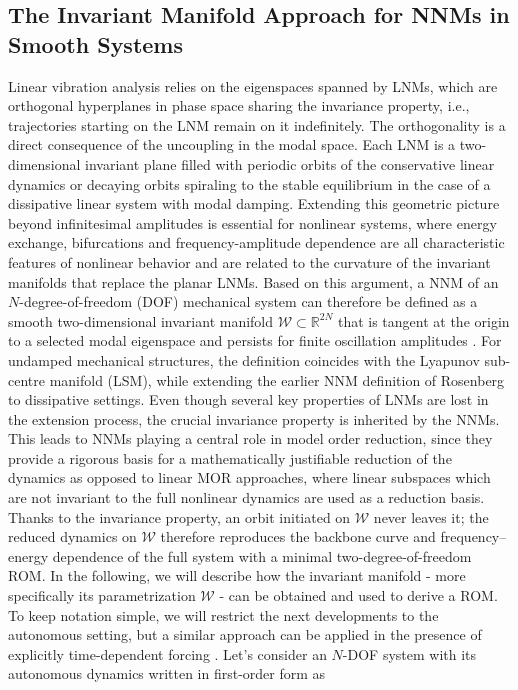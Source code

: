 \documentclass[a4paper,9pt,parskip=half,english]{article}
\theoremstyle{plain}
\theoremstyle{definition}
\newcommand{\mR}{\mathbb{R}}
\begin{document}
\subsection{The Invariant Manifold Approach for NNMs in Smooth Systems}\label{Subsection_invManifApproach}
Linear vibration analysis relies on the eigenspaces spanned by LNMs, which are orthogonal hyperplanes in phase space sharing the invariance property, i.e., trajectories starting on the LNM remain on it indefinitely. The orthogonality is a direct consequence of the uncoupling in the modal space. Each LNM is a two-dimensional invariant plane filled with periodic orbits of the conservative linear dynamics or decaying orbits spiraling to the stable equilibrium in the case of a dissipative linear system with modal damping. Extending this geometric picture beyond infinitesimal amplitudes is essential for nonlinear systems, where energy exchange, bifurcations and frequency-amplitude dependence are all characteristic features of nonlinear behavior and are related to the curvature of the invariant manifolds that replace the planar LNMs. Based on this argument, a NNM of an $N$-degree-of-freedom (DOF) mechanical system can therefore be defined as a smooth two-dimensional invariant manifold $\mathcal{W} \subset \mR^{2N}$ that is tangent at the origin to a selected modal eigenspace and persists for finite oscillation amplitudes \cite{Shaw1991}. For undamped mechanical structures, the definition coincides with the Lyapunov sub-centre manifold (LSM), while extending the earlier NNM definition of Rosenberg \cite{Rosenberg1962} to dissipative settings. Even though several key properties of LNMs are lost in the extension process, the crucial invariance property is inherited by the NNMs. This leads to NNMs playing a central role in model order reduction, since they provide a rigorous basis for a mathematically justifiable reduction of the dynamics as opposed to linear MOR approaches, where linear subspaces which are not invariant to the full nonlinear dynamics are used as a reduction basis. Thanks to the invariance property, an orbit initiated on $\mathcal{W}$ never leaves it; the reduced dynamics on $\mathcal{W}$ therefore reproduces the backbone curve and frequency–energy dependence of the full system with a minimal two-degree-of-freedom ROM.
In the following, we will describe how the invariant manifold - more specifically its parametrization $\mathcal{W}$ - can be obtained and used to derive a ROM. To keep notation simple, we will restrict the next developments to the autonomous setting, but a similar approach can be applied in the presence of explicitly time-dependent forcing \cite{Jiang2005,Shaw2014}. Let's consider an $N$-DOF system with its autonomous dynamics written in first-order form as
\end{document}
